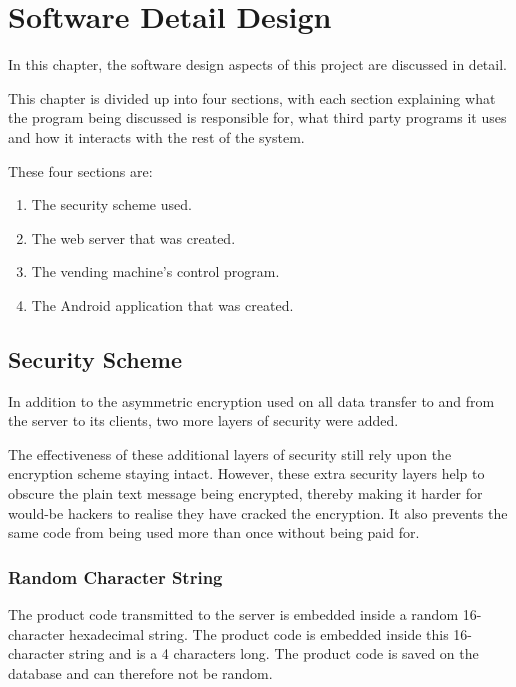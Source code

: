 \chapter{Software Detail Design}
\label{chap:4}

In this chapter, the software design aspects of this project are discussed in
detail.

This chapter is divided up into four sections, with each section explaining what
the program being discussed is responsible for, what third party programs it
uses and how it interacts with the rest of the system. 

These four sections are:

\begin{enumerate}
  \item The security scheme used.
  \item The web server that was created.
  \item The vending machine's control program.
  \item The Android application that was created.
\end{enumerate}

\section{Security Scheme}
\label{sec:security-code-scheme}

In addition to the asymmetric encryption used on all data transfer to and from
the server to its clients, two more layers of security were added. 

The effectiveness of these additional layers of security still rely upon the
encryption scheme staying intact. However, these extra security layers help to
obscure the plain text message being encrypted, thereby making it harder for
would-be hackers to realise they have cracked the encryption. It also prevents
the same code from being used more than once without being paid for. 

\subsection{Random Character String}

The product code transmitted to the server is embedded inside a
random 16-character hexadecimal string. The product code is embedded inside this
16-character string and is a 4 characters long. The product code is saved on the
database and can therefore not be random. 

